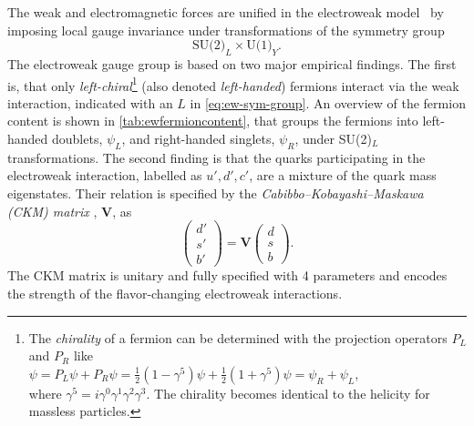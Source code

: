 The weak and electromagnetic forces are unified in the electroweak model~\cite{GLASHOW1961579,SALAM1964168,PhysRevLett.19.1264} by imposing local gauge invariance under transformations of the symmetry group
\begin{equation}
  \label{eq:ew-sym-group}
  \text{SU(2)}_L \times \text{U(1)}_Y.
\end{equation}
The electroweak gauge group is based on two major empirical findings.
The first is, that only \emph{left-chiral}\footnote{
  The \emph{chirality} of a fermion can be determined with the projection operators $P_L$ and $P_R$ like \\
  $\psi = P_L \psi + P_R \psi = \frac{1}{2} \left( 1 - \gamma^5 \right) \psi + \frac{1}{2} \left( 1 + \gamma^5 \right) \psi = \psi_R + \psi_L$, \\
  where $\gamma^5 = i\gamma^0\gamma^1\gamma^2\gamma^3$. The chirality becomes identical to the helicity for massless particles.} (also denoted \emph{left-handed}) fermions interact via the weak interaction, indicated with an $L$ in \cref{eq:ew-sym-group}. An overview of the fermion content is shown in \cref{tab:ewfermioncontent}, that groups the fermions into left-handed doublets, $\psi_L$, and right-handed singlets, $\psi_R$, under SU(2)$_L$ transformations. 
The second finding is that the quarks participating in the electroweak interaction, labelled as $u', d', c'$, are a mixture of the quark mass eigenstates. Their relation is specified by the \emph{Cabibbo–Kobayashi–Maskawa (CKM) matrix} \cite{doi:10.1143/PTP.49.652}, $\pmb{V}$, as
\begin{equation}
  \begin{pmatrix}
   d' \\
   s' \\
   b'
 \end{pmatrix}
 = 
 \pmb{V} 
 \begin{pmatrix}
   d \\
   s \\
   b
 \end{pmatrix}.
\end{equation}
The CKM matrix is unitary and fully specified with 4 parameters and encodes the strength of the flavor-changing electroweak interactions.

